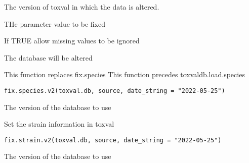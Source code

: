 \documentclass[letterpaper]{book}
\begin{document}
%
\begin{Arguments}
\begin{ldescription}
\item[\code{toxval.db}] The version of toxval in which the data is altered.

\item[\code{param}] THe parameter value to be fixed

\item[\code{ignore}] If TRUE allow missing values to be ignored
\end{ldescription}
\end{Arguments}
%
\begin{Value}
The database will be altered
\end{Value}
%
\begin{Description}\relax
This function replaces fix.species
This function precedes toxvaldb.load.species
\end{Description}
%
\begin{Usage}
\begin{verbatim}
fix.species.v2(toxval.db, source, date_string = "2022-05-25")
\end{verbatim}
\end{Usage}
%
\begin{Arguments}
\begin{ldescription}
\item[\code{toxval.db}] The version of the database to use
\end{ldescription}
\end{Arguments}
%
\begin{Description}\relax
Set the strain information in toxval
\end{Description}
%
\begin{Usage}
\begin{verbatim}
fix.strain.v2(toxval.db, source, date_string = "2022-05-25")
\end{verbatim}
\end{Usage}
%
\begin{Arguments}
\begin{ldescription}
\item[\code{toxval.db}] The version of the database to use
\end{ldescription}
\end{Arguments}
\end{document}
